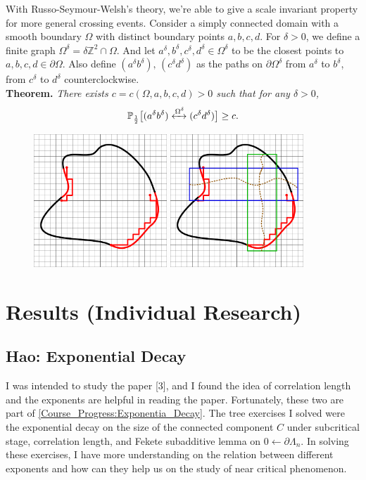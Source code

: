 \documentclass[12pt]{article}
\theoremstyle{plane}
\theoremstyle{definition}
\begin{document}
With Russo-Seymour-Welsh's theory, we're able to give a scale invariant property for more general crossing events. Consider a simply connected domain with a smooth boundary $\Omega$ with distinct boundary points $a,b,c,d$. For $\delta>0$, we define a finite graph $\Omega^\delta=\delta\mathbb{Z}^2\cap\Omega$. And let $a^\delta, b^\delta, c^\delta, d^\delta\in\Omega^\delta$ to be the closest points to $a,b,c,d\in\partial\Omega$. Also define $(a^\delta b^\delta),\,(c^\delta d^\delta)$ as the paths on $\partial\Omega^\delta$ from $a^\delta$ to $b^\delta$, from $c^\delta$ to $d^\delta$ counterclockwise.\\[12pt]
\textbf{Theorem.} \textit{There exists $c=c(\Omega,a,b,c,d)>0$ such that for any $\delta>0$,}
\begin{equation*}
\mathbb{P}_\frac{1}{2}\big[(a^\delta b^\delta)\xleftrightarrow{\text{$\Omega^\delta$}}(c^\delta d^\delta)\big]\geq c.
\end{equation*}
    
\begin{figure}[h]
\centering
\includegraphics[width=5.0cm]{./picture/omega_2.png}
\includegraphics[width=5.0cm]{./picture/omega_2_crossing.png}
\end{figure}
\newpage
    

\section{Results (Individual Research)}
\subsection*{Hao: Exponential Decay}
I was intended to study the paper [3], and I found the idea of correlation length and the exponents are helpful in reading the paper. Fortunately, these two are part of \ref{Course_Progress:Exponentia_Decay}. 
The tree exercises I solved were the exponential decay on the size of the connected component $C$ under subcritical stage, correlation length, and Fekete subadditive lemma on $0 \longleftarrow \partial \Lambda_n$.
In solving these exercises, I have more understanding on the relation between different exponents and how can they help us on the study of near critical phenomenon.  
\bigskip
\end{document}
